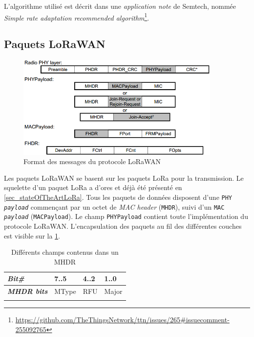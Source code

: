 L'algorithme utilisé est décrit dans une \textit{application note} de Semtech, nommée \textit{Simple rate adaptation recommended algorithm}\footnote{\url{https://github.com/TheThingsNetwork/ttn/issues/265\#issuecomment-255092765}}.


\subsection{Paquets LoRaWAN}

\begin{figure}[ht!]
    \centering
    \includegraphics[width=0.9\textwidth]{Figures/Protocols/LoRaWAN/lorawan_mac_format_packets.png}
    \caption{Format des messages du protocole LoRaWAN}
    \label{fig-lorawan_mac_format_packets}
\end{figure}


Les paquets LoRaWAN se basent sur les paquets LoRa pour la transmission. Le squelette d'un paquet LoRa a d'ores et déjà été présenté en \cref{sec_stateOfTheArtLoRa}. Tous les paquets de données disposent d'une \texttt{PHY \textit{payload}} commençant par un octet de \textit{MAC header} (\texttt{MHDR}), suivi d'un \texttt{MAC \textit{payload}} (\texttt{MACPayload}). Le champ \texttt{PHYPayload} contient toute l'implémentation du protocole LoRaWAN. L'encapsulation des paquets au fil des différentes couches est visible sur la \cref{fig-lorawan_mac_format_packets}.


\begin{table}[ht!]
\centering
\caption{Différents champs contenus dans un MHDR}
\label{tab-header_MHDR_content}
\begin{tabular}{
>{\columncolor[HTML]{BBDAFF}}l |l|l|l|}
\cline{2-4}
\textbf{\textit{Bit\#}} & 7..5 & 4..2 & 1..0 \\ \hline
\textbf{\textit{MHDR bits}} & MType & RFU & Major \\ \cline{2-4} 
\end{tabular}
\end{table}

